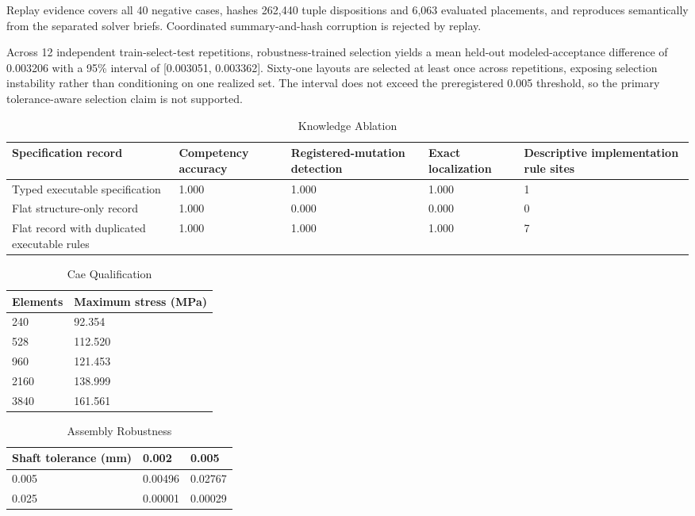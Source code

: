 \documentclass[preprint,12pt]{elsarticle}
\begin{document}
Replay evidence covers all 40 negative cases, hashes 262,440 tuple dispositions and 6,063 evaluated placements, and reproduces semantically from the separated solver briefs. Coordinated summary-and-hash corruption is rejected by replay.

Across 12 independent train-select-test repetitions, robustness-trained selection yields a mean held-out modeled-acceptance difference of 0.003206 with a 95\% interval of [0.003051, 0.003362]. Sixty-one layouts are selected at least once across repetitions, exposing selection instability rather than conditioning on one realized set. The interval does not exceed the preregistered 0.005 threshold, so the primary tolerance-aware selection claim is not supported.

\begin{table}[htbp]
\centering
\caption{Knowledge Ablation}
\small
\begin{tabular}{lllll}
\textbf{Specification record} & \textbf{Competency accuracy} & \textbf{Registered-mutation detection} & \textbf{Exact localization} & \textbf{Descriptive implementation rule sites} \\
\hline
Typed executable specification & 1.000 & 1.000 & 1.000 & 1 \\
Flat structure-only record & 1.000 & 0.000 & 0.000 & 0 \\
Flat record with duplicated executable rules & 1.000 & 1.000 & 1.000 & 7 \\
\end{tabular}
\end{table}
\begin{table}[htbp]
\centering
\caption{Cae Qualification}
\small
\begin{tabular}{ll}
\textbf{Elements} & \textbf{Maximum stress (MPa)} \\
\hline
240 & 92.354 \\
528 & 112.520 \\
960 & 121.453 \\
2160 & 138.999 \\
3840 & 161.561 \\
\end{tabular}
\end{table}
\begin{table}[htbp]
\centering
\caption{Assembly Robustness}
\small
\begin{tabular}{lll}
\textbf{Shaft tolerance (mm)} & \textbf{0.002} & \textbf{0.005} \\
\hline
0.005 & 0.00496 & 0.02767 \\
0.025 & 0.00001 & 0.00029 \\
\end{tabular}
\end{table}
\end{document}
